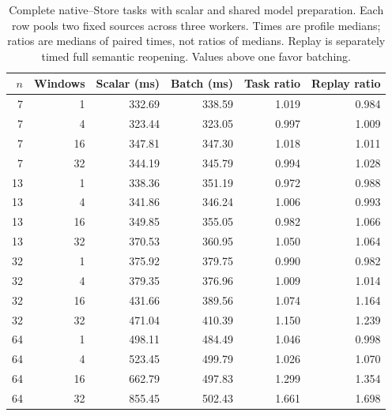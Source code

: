 \begin{table}[htbp]\centering\small
\caption{Complete native--Store tasks with scalar and shared model preparation. Each row pools two fixed sources across three workers. Times are profile medians; ratios are medians of paired times, not ratios of medians. Replay is separately timed full semantic reopening. Values above one favor batching.}\label{tab:batchowner}
\begin{tabular}{rr rrrr}\toprule
$n$ & Windows & Scalar (ms) & Batch (ms) & Task ratio & Replay ratio\\\midrule
7 & 1 & 332.69 & 338.59 & 1.019 & 0.984 \\
7 & 4 & 323.44 & 323.05 & 0.997 & 1.009 \\
7 & 16 & 347.81 & 347.30 & 1.018 & 1.011 \\
7 & 32 & 344.19 & 345.79 & 0.994 & 1.028 \\
13 & 1 & 338.36 & 351.19 & 0.972 & 0.988 \\
13 & 4 & 341.86 & 346.24 & 1.006 & 0.993 \\
13 & 16 & 349.85 & 355.05 & 0.982 & 1.066 \\
13 & 32 & 370.53 & 360.95 & 1.050 & 1.064 \\
32 & 1 & 375.92 & 379.75 & 0.990 & 0.982 \\
32 & 4 & 379.35 & 376.96 & 1.009 & 1.014 \\
32 & 16 & 431.66 & 389.56 & 1.074 & 1.164 \\
32 & 32 & 471.04 & 410.39 & 1.150 & 1.239 \\
64 & 1 & 498.11 & 484.49 & 1.046 & 0.998 \\
64 & 4 & 523.45 & 499.79 & 1.026 & 1.070 \\
64 & 16 & 662.79 & 497.83 & 1.299 & 1.354 \\
64 & 32 & 855.45 & 502.43 & 1.661 & 1.698 \\
\bottomrule\end{tabular}
\end{table}
